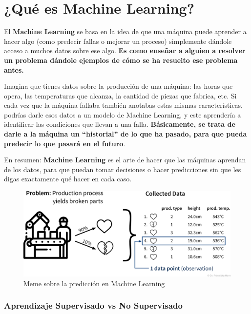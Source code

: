 \section{\textbf{¿Qué es Machine Learning?}}\label{que-es-machine-learning}

El \textbf{Machine Learning} se basa en la idea de que una máquina puede aprender a hacer algo (como predecir fallas o mejorar un proceso) simplemente dándole acceso a muchos datos sobre ese algo. \textbf{Es como enseñar a alguien a resolver un problema dándole ejemplos de cómo se ha resuelto ese problema antes.}

Imagina que tienes datos sobre la producción de una máquina: las horas que opera, las temperaturas que alcanza, la cantidad de piezas que fabrica, etc. Si cada vez que la máquina fallaba también anotabas estas mismas características, podrías darle esos datos a un modelo de Machine Learning, y este aprendería a identificar las condiciones que llevan a una falla. \textbf{Básicamente, se trata de darle a la máquina un ``historial'' de lo que ha pasado, para que pueda predecir lo que pasará en el futuro}.

En resumen: \textbf{Machine Learning} es el arte de hacer que las máquinas aprendan de los datos, para que puedan tomar decisiones o hacer predicciones sin que les digas exactamente qué hacer en cada caso.

\begin{figure}[H]
\centering
\begin{adjustbox}{width=\textwidth}
\includegraphics{img/imagen_32.jpg}
\end{adjustbox}
\caption{Meme sobre la predicción en Machine Learning}
\end{figure}

\subsubsection{\textbf{Aprendizaje Supervisado vs No Supervisado}}\label{aprendizaje-supervisado-vs-no-supervisado}

